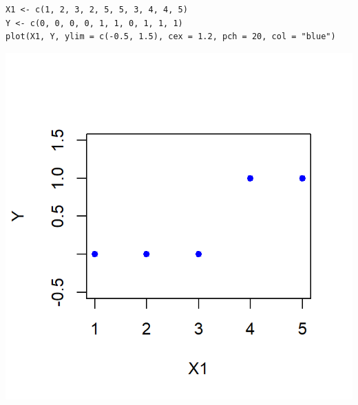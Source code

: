 \begin{minipage}{0.48\textwidth}
\begin{lstlisting}
X1 <- c(1, 2, 3, 2, 5, 5, 3, 4, 4, 5)
Y <- c(0, 0, 0, 0, 1, 1, 0, 1, 1, 1)
plot(X1, Y, ylim = c(-0.5, 1.5), cex = 1.2, pch = 20, col = "blue")
\end{lstlisting}
\begin{center}
	\includegraphics[width=\linewidth]{"Temas/Imágenes/Tema 3/screenshot005"}
\end{center}


\end{minipage}
